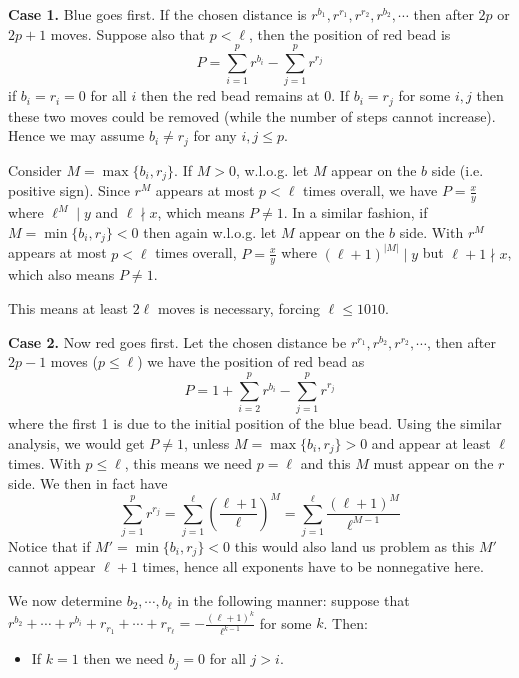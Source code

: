 \documentclass[11pt,a4paper]{article}
\begin{document}
\begin{enumerate}
	    \textbf{Case 1.} 
	    Blue goes first. If the chosen distance is $r^{b_1}, r^{r_1}, r^{r_2}, r^{b_2}, \cdots$ then after $2p$ or $2p+1$ moves. Suppose also that $p < \ell$, then the position of red bead is 
	    \[
	    P = \sum_{i=1}^p r^{b_i} - \sum_{j=1}^p r^{r_j}
	    \]
	    if $b_i=r_i=0$ for all $i$ then the red bead remains at 0. 
	    If $b_i=r_j$ for some $i, j$ then these two moves could be removed (while the number of steps cannot increase). 
	    Hence we may assume $b_i\neq r_j$ for any $i, j\le p$. 
	    
	    Consider $M = \max \{b_i, r_j\}$. If $M > 0$, w.l.o.g. let $M$ appear on the $b$ side (i.e. positive sign). 
	    Since $r^M$ appears at most $p<\ell$ times overall, we have $P=\frac{x}{y}$ where $\ell^M\mid y$ and $\ell\nmid x$, which means $P\neq 1$. 
	    In a similar fashion, 
	    if $M = \min \{b_i, r_j\} < 0$ then again w.l.o.g. let $M$ appear on the $b$ side. 
	    With $r^M$ appears at most $p<\ell$ times overall, $P=\frac{x}{y}$ where $(\ell+1)^{|M|}\mid y$ but $\ell+1\nmid x$, which also means $P\neq 1$. 
	    
	    This means at least $2\ell$ moves is necessary, forcing $\ell\le 1010$. 
	    
	    \textbf{Case 2.} Now red goes first. 
	    Let the chosen distance be $r^{r_1}, r^{b_2}, r^{r_2}, \cdots$, then after $2p-1$ moves ($p\le\ell$) we have the position of red bead as 
	    \[
	    P = 1 +\sum_{i=2}^p r^{b_i} -\sum_{j=1}^p r^{r_j}
	    \] 
	    where the first 1 is due to the initial position of the blue bead. 
	    Using the similar analysis, we would get $P\neq 1$, unless $M = \max \{b_i, r_j\} > 0$ and appear at least $\ell$ times. 
	    With $p\le\ell$, this means we need $p=\ell$ and this $M$ must appear on the $r$ side. 
	    We then in fact have 
	    \[
	    \sum_{j=1}^p r^{r_j}
	    =\sum_{j=1}^{\ell} \left(\frac{\ell+1}{\ell}\right)^M
	    =\sum_{j=1}^{\ell} \frac{(\ell+1)^{M}}{\ell^{M-1}}
	    \]
	    Notice that if $M'=\min\{b_i, r_j\}<0$ this would also land us problem as this $M'$ cannot appear $\ell+1$ times, hence all exponents have to be nonnegative here. 
	    
	    We now determine $b_2, \cdots, b_{\ell}$ in the following manner: 
	    suppose that $r^{b_2}+\cdots + r^{b_i} + r_{r_1}+\cdots + r_{r_\ell} = -\frac{(\ell+1)^{k}}{\ell^{k-1}}$ for some $k$. 
	    Then: 
	    \begin{itemize}
	    	\item If $k=1$ then we need $b_j=0$ for all $j>i$. 
	    	

\end{itemize}
\end{enumerate}
\end{document}
